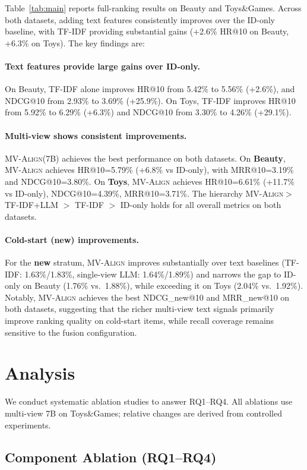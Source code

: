 \documentclass[sigconf,natbib=true,anonymous]{acmart}
\newcommand{\model}{\textsc{MV-Align}\xspace}
\newcommand{\tfidf}{\textsc{TF-IDF}\xspace}
\newcommand{\llm}{\textsc{LLM}\xspace}
\begin{document}
Table~\ref{tab:main} reports full-ranking results on Beauty
and Toys\&Games. Across both datasets, adding text features
consistently improves over the ID-only baseline, with \tfidf
providing substantial gains (+2.6\% HR@10 on Beauty, +6.3\%
on Toys). The key findings are:

\paragraph{Text features provide large gains over ID-only.}
On Beauty, \tfidf alone improves HR@10 from 5.42\% to 5.56\%
(+2.6\%), and NDCG@10 from 2.93\% to 3.69\% (+25.9\%). On
Toys, \tfidf improves HR@10 from 5.92\% to 6.29\% (+6.3\%)
and NDCG@10 from 3.30\% to 4.26\% (+29.1\%).


\paragraph{Multi-view shows consistent improvements.}
\model (7B) achieves the best performance on both datasets.
On \textbf{Beauty}, \model achieves HR@10=5.79\% (+6.8\% vs
ID-only), with MRR@10=3.19\% and NDCG@10=3.80\%. On
\textbf{Toys}, \model achieves HR@10=6.61\% (+11.7\% vs
ID-only), NDCG@10=4.39\%, MRR@10=3.71\%. The hierarchy
\model $>$ TF-IDF+LLM $>$ TF-IDF $>$ ID-only holds for all
overall metrics on both datasets.

\paragraph{Cold-start (new) improvements.}
For the \textbf{new} stratum, \model improves substantially
over text baselines (\tfidf: 1.63\%/1.83\%, single-view \llm:
1.64\%/1.89\%) and narrows the gap to ID-only on Beauty
(1.76\% vs.\ 1.88\%), while exceeding it on Toys (2.04\%
vs.\ 1.92\%). Notably, \model achieves the best NDCG\_new@10
and MRR\_new@10 on both datasets, suggesting that the richer
multi-view text signals primarily improve ranking quality on
cold-start items, while recall coverage remains sensitive to
the fusion configuration.

\section{Analysis}\label{sec:analysis}

We conduct systematic ablation studies to answer RQ1--RQ4.
All ablations use multi-view 7B on Toys\&Games; relative changes
are derived from controlled experiments.
\subsection{Component Ablation (RQ1--RQ4)}
\end{document}

